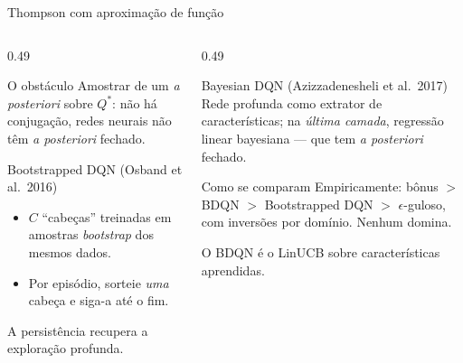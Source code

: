 \documentclass[aspectratio=169, 11pt]{beamer}
\newcommand{\Qstar}{Q^{*}}
\begin{document}
\begin{frame}{Thompson com aproximação de função}
  \begin{columns}[T]
    \begin{column}{0.49\textwidth}
      \begin{defbox}{O obstáculo}
        Amostrar de um \textit{a posteriori} sobre $\Qstar$: não há conjugação, redes
        neurais não têm \textit{a posteriori} fechado.
      \end{defbox}
      \begin{algbox}{Bootstrapped DQN (Osband et al.\ 2016)}
        \begin{itemize}
          \item $C$ ``cabeças'' treinadas em amostras \textit{bootstrap} dos mesmos dados.
          \item Por episódio, sorteie \emph{uma} cabeça e siga-a até o fim.
        \end{itemize}
        A persistência recupera a exploração profunda.
      \end{algbox}
    \end{column}
    \begin{column}{0.49\textwidth}
      \begin{algbox}{Bayesian DQN (Azizzadenesheli et al.\ 2017)}
        Rede profunda como extrator de características; na \emph{última camada},
        regressão linear bayesiana --- que tem \textit{a posteriori} fechado.
      \end{algbox}
      \begin{teobox}{Como se comparam}
        Empiricamente: bônus $>$ BDQN $>$ Bootstrapped DQN $>$ $\epsilon$-guloso, com
        inversões por domínio. Nenhum domina.
      \end{teobox}
      {\small\color{rlCinza} O BDQN é o LinUCB sobre características aprendidas.}
    \end{column}
  \end{columns}
\end{frame}
\end{document}
